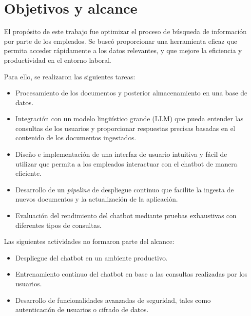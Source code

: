 \vspace{10mm}

\section{Objetivos y alcance}

El propósito de este trabajo fue optimizar el proceso de búsqueda de información por parte de los empleados. Se buscó
proporcionar una herramienta eficaz que permita acceder rápidamente a los datos relevantes, y que mejore la eficiencia y 
productividad en el entorno laboral.

\vspace{10mm}

Para ello, se realizaron las siguientes tareas:

\begin{itemize}
	\item Procesamiento de los documentos y posterior almacenamiento en una base de datos.
	\item Integración con un modelo lingüístico grande (LLM) que pueda entender las consultas de los usuarios y proporcionar respuestas precisas basadas en el contenido de los documentos ingestados.
	\item Diseño e implementación de una interfaz de usuario intuitiva y fácil de utilizar que permita a los empleados interactuar con el chatbot de manera eficiente.
	\item Desarrollo de un \textit{pipeline} de despliegue continuo que facilite la ingesta de nuevos documentos y la actualización de la aplicación.
  \item Evaluación del rendimiento del chatbot mediante pruebas exhaustivas con diferentes tipos de consultas.
\end{itemize}

\vspace{5mm}

Las siguientes actividades no formaron parte del alcance:

\begin{itemize}
	\item Despliegue del chatbot en un ambiente productivo.
	\item Entrenamiento continuo del chatbot en base a las consultas realizadas por los usuarios.
	\item Desarrollo de funcionalidades avanzadas de seguridad, tales como autenticación de usuarios o cifrado de datos.
\end{itemize}

